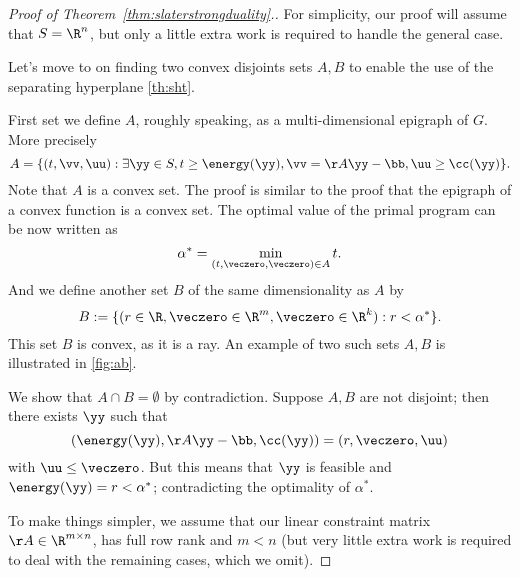 \begin{proof}[Proof of Theorem~\ref{thm:slaterstrongduality}.]
  For simplicity, our proof will assume that $S = \R^n$, but only a little
  extra work is required to handle the general case.

  Let's move to on finding two convex disjoints sets $A, B$ to enable the use of the separating hyperplane \autoref{th:sht}.

First set we define $A$, roughly speaking, as a multi-dimensional epigraph of
$G$. More precisely
\begin{equation*} A = \{(t, \vv, \uu) : \exists \yy \in S, t \geq \energy(\yy), \vv = \AA\yy - \bb, \uu \geq \cc(\yy)\}. \end{equation*}
Note that $A$ is a convex set. The proof is similar to the proof that the epigraph of a convex function is a convex set.
The optimal value of the primal program can be now written as
\begin{equation*} \alpha^* = \min_{(t,\veczero,\veczero) \in A} t. \end{equation*}
And we define another set $B$ of the same dimensionality as $A$ by
\begin{equation*} B := \{(r \in \R, \veczero \in \R^m, \veczero \in \R^k) : r < \alpha^* \}. \end{equation*}
This set $B$ is convex, as it is a ray.
An example of two such sets $A,B$ is illustrated in \autoref{fig:ab}.

We show that $A \cap B = \emptyset$ by contradiction.
Suppose $A, B$ are not disjoint; then there exists $\yy$ such that
\begin{equation*} (\energy(\yy), \AA\yy-\bb, \cc(\yy)) = (r, \veczero, \uu) \end{equation*}
with $\uu \leq \veczero$.
But this means that $\yy$ is feasible and  $\energy(\yy) = r < \alpha^*$; contradicting the optimality of $\alpha^*$.

To make things simpler,
we assume that our linear constraint matrix $\AA \in \R^{m\times n}$,
has full row rank and $m < n$ (but very little extra work is required to
deal with the remaining cases, which we omit).


\end{proof}
